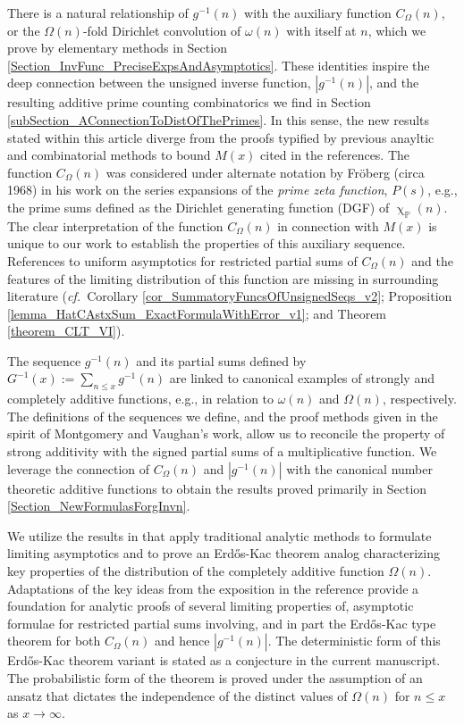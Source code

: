 \documentclass[11pt,reqno,a4letter]{article}
\numberwithin{figure}{section}
\numberwithin{table}{section}
\newcommand{\cf}{\textit{cf.\ }}
\renewcommand{\chi}{\upchi}
\theoremstyle{plain}
\numberwithin{theorem}{section}
\theoremstyle{definition}
\begin{document}
There is a natural relationship of $g^{-1}(n)$ with the auxiliary function 
$C_{\Omega}(n)$, or the $\Omega(n)$-fold Dirichlet convolution of $\omega(n)$ 
with itself at $n$, which we prove by elementary methods in 
Section \ref{Section_InvFunc_PreciseExpsAndAsymptotics}. 
These identities inspire the deep connection between the 
unsigned inverse function, $|g^{-1}(n)|$, 
and the resulting additive prime counting combinatorics we find in 
Section \ref{subSection_AConnectionToDistOfThePrimes}. 
In this sense, the new results stated within this article diverge from the proofs 
typified by previous anayltic and combinatorial 
methods to bound $M(x)$ cited in the references. 
The function $C_{\Omega}(n)$ was considered under alternate notation 
by Fr\"oberg (circa 1968) in his work on the series expansions of the 
\emph{prime zeta function}, $P(s)$, 
e.g., the prime sums defined as the 
Dirichlet generating function (DGF) of $\chi_{\mathbb{P}}(n)$. 
The clear interpretation of the function $C_{\Omega}(n)$ in connection with $M(x)$ 
is unique to our work to establish the 
properties of this auxiliary sequence. 
References to uniform asymptotics for restricted partial sums of 
$C_{\Omega}(n)$ and the features of the limiting distribution 
of this function are missing in surrounding literature 
(\cf Corollary \ref{cor_SummatoryFuncsOfUnsignedSeqs_v2}; 
Proposition \ref{lemma_HatCAstxSum_ExactFormulaWithError_v1}; and 
Theorem \ref{theorem_CLT_VI}). 

The sequence $g^{-1}(n)$ and its partial sums defined by 
$G^{-1}(x) := \sum_{n \leq x} g^{-1}(n)$ are linked to 
canonical examples of strongly and completely additive functions, 
e.g., in relation to $\omega(n)$ and $\Omega(n)$, respectively. 
The definitions of the sequences we define, and the 
proof methods given in the spirit of Montgomery and Vaughan's work, 
allow us to reconcile the property of strong additivity with the signed 
partial sums of a multiplicative function. 
We leverage the connection of $C_{\Omega}(n)$ and $|g^{-1}(n)|$ with the 
canonical number theoretic additive functions to obtain the results proved primarily 
in Section \ref{Section_NewFormulasForgInvn}.

We utilize the results in \cite[\S 7.4; \S 2.4]{MV} 
that apply traditional analytic methods to formulate limiting asymptotics and to 
prove an Erd\H{o}s-Kac theorem analog characterizing key properties of the 
distribution of the completely additive 
function $\Omega(n)$. Adaptations of the key ideas 
from the exposition in the reference 
provide a foundation for analytic proofs of several limiting 
properties of, asymptotic formulae for restricted partial sums involving, and in part the 
Erd\H{o}s-Kac type theorem for both 
$C_{\Omega}(n)$ and hence $|g^{-1}(n)|$. 
The deterministic form of this Erd\H{o}s-Kac theorem variant is stated as a conjecture in the 
current manuscript. The probabilistic form of the theorem is proved under the assumption of an 
ansatz that dictates the independence of the distinct values of $\Omega(n)$ for $n \leq x$ as 
$x \rightarrow \infty$.  
\end{document}
